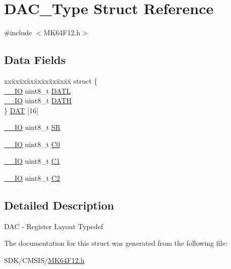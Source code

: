 \hypertarget{struct_d_a_c___type}{}\section{D\+A\+C\+\_\+\+Type Struct Reference}
\label{struct_d_a_c___type}


{\ttfamily \#include $<$M\+K64\+F12.\+h$>$}

\subsection*{Data Fields}
\begin{DoxyCompactItemize}
\item 
\begin{tabbing}
xx\=xx\=xx\=xx\=xx\=xx\=xx\=xx\=xx\=\kill
struct \{\\
\>\mbox{\hyperlink{core__cm4_8h_aec43007d9998a0a0e01faede4133d6be}{\_\_IO}} uint8\_t \mbox{\hyperlink{group___v_r_e_f___peripheral___access___layer_ga2727b3fe1ebf5d8aa026f51a4857e293}{DATL}}\\
\>\mbox{\hyperlink{core__cm4_8h_aec43007d9998a0a0e01faede4133d6be}{\_\_IO}} uint8\_t \mbox{\hyperlink{group___v_r_e_f___peripheral___access___layer_gab715ae4b8d7a52b050b97bb1048fc2a2}{DATH}}\\
\} \mbox{\hyperlink{group___v_r_e_f___peripheral___access___layer_ga453b84b7802e47f03b8eab4469d43da1}{DAT}} \mbox{[}16\mbox{]}\\

\end{tabbing}\item 
\mbox{\hyperlink{core__cm4_8h_aec43007d9998a0a0e01faede4133d6be}{\+\_\+\+\_\+\+IO}} uint8\+\_\+t \mbox{\hyperlink{group___v_r_e_f___peripheral___access___layer_ga5634132d0d636b9eac05627fe9e2b2f9}{SR}}
\item 
\mbox{\hyperlink{core__cm4_8h_aec43007d9998a0a0e01faede4133d6be}{\+\_\+\+\_\+\+IO}} uint8\+\_\+t \mbox{\hyperlink{group___v_r_e_f___peripheral___access___layer_ga0efd9120430014bffb829dea9ae59849}{C0}}
\item 
\mbox{\hyperlink{core__cm4_8h_aec43007d9998a0a0e01faede4133d6be}{\+\_\+\+\_\+\+IO}} uint8\+\_\+t \mbox{\hyperlink{group___v_r_e_f___peripheral___access___layer_gad54aa92be9fc988e74d55d2d3daae8ad}{C1}}
\item 
\mbox{\hyperlink{core__cm4_8h_aec43007d9998a0a0e01faede4133d6be}{\+\_\+\+\_\+\+IO}} uint8\+\_\+t \mbox{\hyperlink{group___v_r_e_f___peripheral___access___layer_ga4f920936a8fc32483b3ebd9b0674b450}{C2}}
\end{DoxyCompactItemize}


\subsection{Detailed Description}
D\+AC -\/ Register Layout Typedef 

The documentation for this struct was generated from the following file\+:\begin{DoxyCompactItemize}
\item 
S\+D\+K/\+C\+M\+S\+I\+S/\mbox{\hyperlink{_m_k64_f12_8h}{M\+K64\+F12.\+h}}\end{DoxyCompactItemize}
